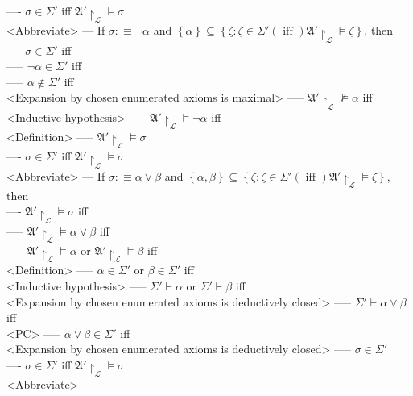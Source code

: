 \documentclass{book}
\newcommand{\is}{:\equiv}
\newcommand{\inot}{\not}
\newcommand{\txtiff}{\left(\text{ iff }\right)}
\newcommand{\set}[1]{\left\{ #1 \right\}}
\begin{document}
				---- $\sigma \in \Sigma'$ iff $\mathfrak{A}' \upharpoonright_\mathcal{L} \vDash \sigma$ \\ <Abbreviate>
			--- If $\sigma \is \lnot \alpha$ and $\set{\alpha} \subseteq \set{\zeta: \zeta \in \Sigma' \txtiff \mathfrak{A}' \upharpoonright_\mathcal{L} \vDash \zeta}$, then \\
				---- $\sigma \in \Sigma'$ iff \\
					----- $\lnot \alpha \in \Sigma'$ iff \\
					----- $\alpha \inot \in \Sigma'$ iff \\ <Expansion by chosen enumerated axioms is maximal>
					----- $\mathfrak{A}' \upharpoonright_\mathcal{L} \inot \vDash \alpha$ iff \\ <Inductive hypothesis>
					----- $\mathfrak{A}' \upharpoonright_\mathcal{L} \vDash \lnot \alpha$ iff \\ <Definition>
					----- $\mathfrak{A}' \upharpoonright_\mathcal{L} \vDash \sigma$	\\
				---- $\sigma \in \Sigma'$ iff $\mathfrak{A}' \upharpoonright_\mathcal{L} \vDash \sigma$ \\ <Abbreviate>
			--- If $\sigma \is \alpha \lor \beta$ and $\set{\alpha, \beta} \subseteq \set{\zeta: \zeta \in \Sigma' \txtiff \mathfrak{A}' \upharpoonright_\mathcal{L} \vDash \zeta}$, then \\
				---- $\mathfrak{A}' \upharpoonright_\mathcal{L} \vDash \sigma$ iff \\
					----- $\mathfrak{A}' \upharpoonright_\mathcal{L} \vDash \alpha \lor \beta$ iff \\
					----- $\mathfrak{A}' \upharpoonright_\mathcal{L} \vDash \alpha$ or $\mathfrak{A}' \upharpoonright_\mathcal{L} \vDash \beta$ iff \\ <Definition>
					----- $\alpha \in \Sigma'$ or $\beta \in \Sigma'$ iff \\ <Inductive hypothesis>
					----- $\Sigma' \vdash \alpha$ or $\Sigma' \vdash \beta$ iff \\ <Expansion by chosen enumerated axioms is deductively closed>
					----- $\Sigma' \vdash \alpha \lor \beta$ iff \\ <PC>
					----- $\alpha \lor \beta \in \Sigma'$ iff \\ <Expansion by chosen enumerated axioms is deductively closed>
					----- $\sigma \in \Sigma'$ \\
				---- $\sigma \in \Sigma'$ iff $\mathfrak{A}' \upharpoonright_\mathcal{L} \vDash \sigma$ \\ <Abbreviate>
\end{document}
